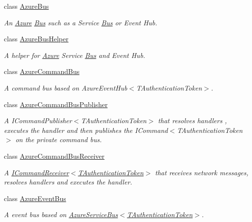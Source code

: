 \begin{DoxyCompactItemize}
\item 
class \hyperlink{classCqrs_1_1Azure_1_1ServiceBus_1_1AzureBus}{Azure\+Bus}
\begin{DoxyCompactList}\small\item\em An \hyperlink{namespaceCqrs_1_1Azure}{Azure} \hyperlink{namespaceCqrs_1_1Bus}{Bus} such as a Service \hyperlink{namespaceCqrs_1_1Bus}{Bus} or Event Hub. \end{DoxyCompactList}\item 
class \hyperlink{classCqrs_1_1Azure_1_1ServiceBus_1_1AzureBusHelper}{Azure\+Bus\+Helper}
\begin{DoxyCompactList}\small\item\em A helper for \hyperlink{namespaceCqrs_1_1Azure}{Azure} Service \hyperlink{namespaceCqrs_1_1Bus}{Bus} and Event Hub. \end{DoxyCompactList}\item 
class \hyperlink{classCqrs_1_1Azure_1_1ServiceBus_1_1AzureCommandBus}{Azure\+Command\+Bus}
\begin{DoxyCompactList}\small\item\em A command bus based on Azure\+Event\+Hub$<$\+T\+Authentication\+Token$>$. \end{DoxyCompactList}\item 
class \hyperlink{classCqrs_1_1Azure_1_1ServiceBus_1_1AzureCommandBusPublisher}{Azure\+Command\+Bus\+Publisher}
\begin{DoxyCompactList}\small\item\em A I\+Command\+Publisher$<$\+T\+Authentication\+Token$>$ that resolves handlers , executes the handler and then publishes the I\+Command$<$\+T\+Authentication\+Token$>$ on the private command bus. \end{DoxyCompactList}\item 
class \hyperlink{classCqrs_1_1Azure_1_1ServiceBus_1_1AzureCommandBusReceiver}{Azure\+Command\+Bus\+Receiver}
\begin{DoxyCompactList}\small\item\em A \hyperlink{interfaceCqrs_1_1Commands_1_1ICommandReceiver}{I\+Command\+Receiver$<$\+T\+Authentication\+Token$>$} that receives network messages, resolves handlers and executes the handler. \end{DoxyCompactList}\item 
class \hyperlink{classCqrs_1_1Azure_1_1ServiceBus_1_1AzureEventBus}{Azure\+Event\+Bus}
\begin{DoxyCompactList}\small\item\em A event bus based on \hyperlink{classCqrs_1_1Azure_1_1ServiceBus_1_1AzureServiceBus_a09e34bafdb96fb8136efa428df9f80b2_a09e34bafdb96fb8136efa428df9f80b2}{Azure\+Service\+Bus$<$\+T\+Authentication\+Token$>$}. \end{DoxyCompactList}\item 

\end{DoxyCompactItemize}
